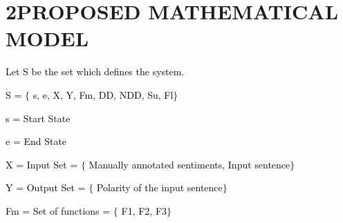 \documentclass[12pt]{article}
\begin{document}
\vspace{\baselineskip}

\vspace{\baselineskip}

\vspace{\baselineskip}

\vspace{\baselineskip}

\vspace{\baselineskip}
\begin{justify}
 
\end{justify}\par

\begin{justify}
 
\end{justify}\par


\vspace{\baselineskip}

\vspace{\baselineskip}

\vspace{\baselineskip}
\section*{2\hspace*{10pt}PROPOSED MATHEMATICAL MODEL}
\textcolor[HTML]{00000A}{Let S be the set which defines the system.}\par

\textcolor[HTML]{00000A}{S = $ \{ $ s, e, X, Y, Fm, DD, NDD, Su, Fl$ \} $ }\par

\textcolor[HTML]{00000A}{s = Start State}\par

\textcolor[HTML]{00000A}{e = End State}\par

\textcolor[HTML]{00000A}{X = Input Set = $ \{ $ Manually annotated sentiments, Input sentence$ \} $ }\par

\textcolor[HTML]{00000A}{Y = Output Set = $ \{ $ Polarity of the input sentence$ \} $ }\par

\textcolor[HTML]{00000A}{Fm = Set of functions = $ \{ $ F1, F2, F3$ \} $ }\par
\end{document}
